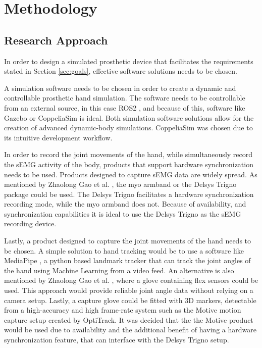 \documentclass[../main.tex]{subfiles}
\begin{document}
\section{Methodology}

\subsection{Research Approach}
\label{sec:software}

In order to design a simulated prosthetic device that facilitates the requirements stated in Section \ref{sec:goals}, effective software solutions needs to be chosen.

A simulation software needs to be chosen in order to create a dynamic and controllable prosthetic hand simulation.
The software needs to be controllable from an external source, in this case ROS2 \cite{ros2}, and because of this, software like Gazebo \cite{gazebo} or CoppeliaSim \cite{coppeliasim} is ideal.
Both simulation software solutions allow for the creation of advanced dynamic-body simulations.
CoppeliaSim \cite{coppeliasim} was chosen due to its intuitive development workflow.

In order to record the joint movements of the hand, while simultaneously record the sEMG activity of the body, products that support hardware synchronization needs to be used.
Products designed to capture sEMG data are widely spread.
As mentioned by Zhaolong Gao et al. \cite{Zhaolong2021}, the myo armband \cite{myo} or the Delsys Trigno package \cite{emgworks} could be used.
The Delsys Trigno \cite{emgworks} facilitates a hardware synchronization recording mode, while the myo armband \cite{myo} does not.
Because of availability, and synchronization capabilities it is ideal to use the Delsys Trigno as the sEMG recording device.

Lastly, a product designed to capture the joint movements of the hand needs to be chosen.
A simple solution to hand tracking would be to use a software like MediaPipe \cite{mediapipe}, a python based landmark tracker that can track the joint angles of the hand using Machine Learning from a video feed.
An alternative is  also mentioned by Zhaolong Gao et al. \cite{Zhaolong2021}, where a glove containing flex sensors could be used.
This approach would provide reliable joint angle data without relying on a camera setup.
Lastly, a capture glove could be fitted with 3D markers, detectable from a high-accuracy and high frame-rate system such as the Motive motion capture setup \cite{optitrack} created by OptiTrack.
It was decided that the the Motive product would be used due to availability and the additional benefit of having a hardware synchronization feature, that can interface with the Delsys Trigno \cite{emgworks} setup.
\end{document}
